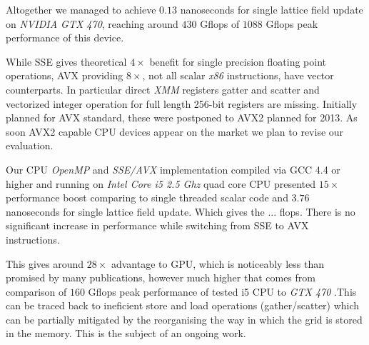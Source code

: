 \documentclass[11pt,a4paper]{article}
\begin{document}
Altogether we managed to achieve $0.13$ nanoseconds for single lattice
field update on \emph{NVIDIA GTX 470}, reaching around $430$ Gflops of
$1088$ Gflops peak performance of this device. 


While SSE gives theoretical $4\times$ benefit for single precision
floating point operations, AVX providing $8\times$, not all scalar
\emph{x86} instructions, have vector counterparts.  In particular
direct \emph{XMM} registers gatter and scatter and vectorized integer
operation for full length 256-bit registers are missing. Initially
planned for AVX standard, these were postponed to AVX2 planned for
2013. As soon AVX2 capable CPU devices appear on the
market we plan to revise our evaluation.


Our CPU \emph{OpenMP} and \emph{SSE/AVX} implementation compiled via
GCC 4.4 or higher and running on \emph{Intel Core i5 2.5 Ghz} quad
core CPU presented $15\times$ performance boost comparing to single
threaded scalar code and $3.76$ nanoseconds for single lattice field
update.  Which gives the ... flops. There is no significant increase
in performance while switching from SSE to AVX instructions.

This gives around $28\times$ advantage to GPU, which is noticeably
less than promised by many publications, however much higher that
comes from comparison of $160$ Gflops peak performance of tested i5
CPU to \emph{GTX 470} \cite{Lee:2010:DGV:1816038.1816021}.This can be
traced back to ineficient store and load operations (gather/scatter)
which can be partially mitigated by the reorganising the way in which
the grid is stored in the memory. This is the subject of an ongoing
work.

{}

\end{document}
